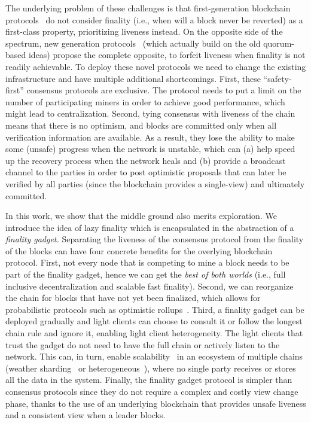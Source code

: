 \documentclass[a4paper,UKenglish,cleveref, autoref, thm-restate, anonymous]{lipics-v2019}
\begin{document}
The underlying problem of these challenges is that first-generation blockchain protocols~\cite{nakamoto08bitcoin,garay15bitcoin} do not consider finality (i.e., when will a block never be reverted) as a first-class property, prioritizing liveness instead.
On the opposite side of the spectrum, new generation protocols~\cite{kokoris16enhancing,decker16bitcoin,pass16hybrid} (which actually build on the old quorum-based ideas) propose the complete opposite, to forfeit liveness when finality is not readily achievable.
To deploy these novel protocols we need to change the existing infrastructure and have multiple additional shortcomings.
First, these ``safety-first'' consensus protocols are exclusive. The protocol needs to put a limit on the number of participating miners in order to achieve good performance, which might lead to centralization. 
Second, tying consensus with liveness of the chain means that there is no optimism, and blocks are committed only when all verification information are available. As a result, they lose the ability to make some (unsafe) progress when the network is unstable, which can (a) help speed up the recovery process when the network heals and (b) provide a broadcast channel to the parties in order to post optimistic proposals that can later be verified by all parties (since the blockchain provides a single-view) and ultimately committed.

In this work, we show that the middle ground also merits exploration. We introduce the idea of lazy finality which is encapsulated in the abstraction of a \emph{finality gadget.}
Separating the liveness of the consensus protocol from the finality of the blocks can have four concrete benefits for the overlying blockchain protocol. First, not every node that is competing to mine a block needs to be part of the finality gadget, hence we can get the \textit{best of both worlds} (i.e., full inclusive decentralization and scalable fast finality). Second, we can reorganize the chain for blocks that have not yet been finalized, which allows for probabilistic protocols such as optimistic rollups~\cite{al19lazyledger}. Third, a finality gadget can be deployed gradually and light clients can choose to consult it or follow the longest chain rule and ignore it, enabling light client heterogeneity. 
The light clients that trust the gadget do not need to have the full chain or actively listen to the network. 
This can, in turn, enable scalability~\cite{avarikioti19divide} in an ecosystem of multiple chains (weather sharding~\cite{kokoris17omniledger,al18chainspace,androulaki18channels} or heterogeneous~\cite{zamyatin19sok}), where no single party receives or stores all the data in the system. 
Finally, the finality gadget protocol is simpler than consensus protocols since they do not require a complex and costly view change phase, thanks to the use of  an underlying blockchain that provides unsafe liveness and a consistent view when a leader blocks.
\end{document}
